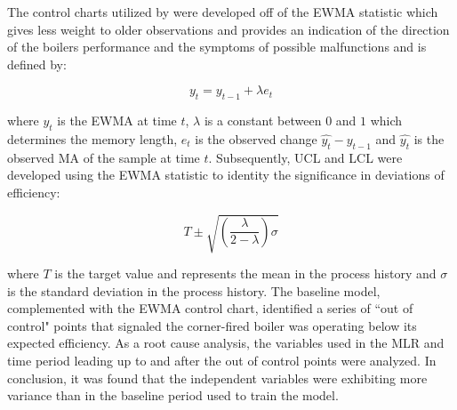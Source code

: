 The control charts utilized by \cite{boiler} were developed off of the \ac{EWMA} statistic which gives less weight to older observations and provides an indication of the direction of the boilers performance and the symptoms of possible malfunctions and is defined by:

\begin{equation}
    y_t = y_{t-1} + \lambda e_t
\end{equation}

where $y_t$ is the EWMA at time $t$, $\lambda$ is a constant between $0$ and $1$ which determines the memory length, $e_t$ is the observed change $\hat{y_t} - y_{t-1}$ and $\hat{y_t}$ is the observed MA of the sample at time $t$. Subsequently, UCL and LCL were developed using the EWMA statistic to identity the significance in deviations of efficiency:

\begin{equation}
    T \pm \sqrt{(\frac{\lambda}{2 - \lambda})\sigma}
\end{equation}

where $T$ is the target value and represents the mean in the process history and $\sigma$ is the standard deviation in the process history. The baseline model, complemented with the EWMA control chart, identified a series of ``out of control" points that signaled the corner-fired boiler was operating below its expected efficiency. As a root cause analysis, the variables used in the MLR and time period leading up to and after the out of control points were analyzed. In conclusion, it was found that the independent variables were exhibiting more variance than in the baseline period used to train the model.